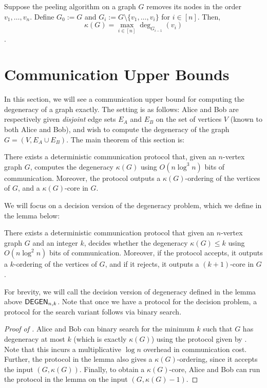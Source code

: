 \documentclass[11pt,letterpaper]{article}
\renewcommand{\leq}{\leqslant}
\theoremstyle{definition}
\newcommand{\degen}{\textnormal{\textsf{DEGEN}}}
\begin{document}
 
  

\begin{fact}\label{fact:peelingmin-degen}
Suppose the peeling algorithm on a graph $G$ removes its nodes in the order $v_1,\ldots,v_n$. Define $G_0:=G$ and $G_i:= G\setminus \{v_1,\ldots,v_i\}$ for $i\in [n]$. Then, $$\kappa(G)=\max_{i\in [n]} \deg_{G_{i-1}}(v_i)$$. 
\end{fact}




\section{Communication Upper Bounds}\label{sec:communication-upper}

In this section, we will see a communication upper bound for computing
the degeneracy of a graph exactly.
The setting is as follows:
Alice and Bob are respectively given \emph{disjoint} edge sets $E_A$ and $E_B$ on the set of
vertices $V$ (known to both Alice and Bob), and wish to compute the degeneracy of the graph
$G = (V, E_A \cup E_B)$.
The main theorem of this section is:


\begin{theorem}\label{thm:communication-upper}
  There exists a deterministic communication protocol that, given an $n$-vertex
  graph $G$, computes the degeneracy $\kappa(G)$ using $O(n \log^3 n)$ bits of
  communication.
  Moreover, the protocol outputs a $\kappa(G)$-ordering of the vertices
  of $G$, and a $\kappa(G)$-core in $G$.
\end{theorem}

We will focus on a decision version of the degeneracy problem, which we define
in the lemma below:

\begin{lemma}\label{lem:degen-decision}
  There exists a deterministic communication protocol that given an $n$-vertex
  graph $G$ and an integer $k$, decides whether the degeneracy
  $\kappa(G) \leq k$ using $O(n \log^2 n)$ bits of communication.
  Moreover, if the protocol accepts, it outputs a $k$-ordering of the vertices
  of $G$, and if it rejects, it outputs a $(k + 1)$-core in $G$.
\end{lemma}

For brevity, we will call the decision version of degeneracy defined in the
lemma above $\degen_{n, k}$.
Note that once we have a protocol for the decision problem, a protocol for the
search variant follows via binary search.
\begin{proof}[Proof of ]
  Alice and Bob can binary search for the minimum $k$ such that $G$ has
  degeneracy at most $k$ (which is exactly $\kappa(G)$) using the protocol
  given by .
  Note that this incurs a multiplicative $\log n$ overhead in communication
  cost.
  Further, the protocol in the lemma also gives a $\kappa(G)$-ordering, since
  it accepts the input $(G, \kappa(G))$.
  Finally, to obtain a $\kappa(G)$-core, Alice and Bob can run the protocol
  in the lemma on the input $(G, \kappa(G) - 1)$.
\end{proof}
\end{document}
